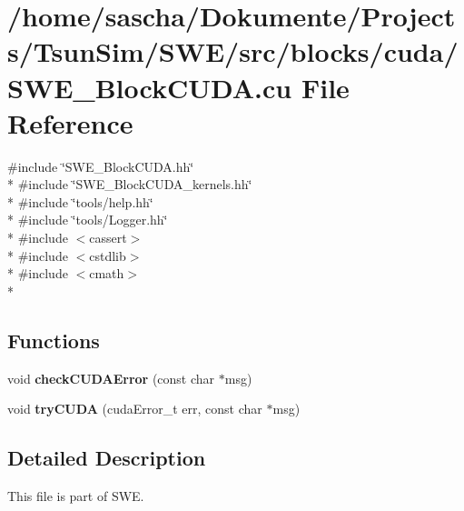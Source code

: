 \hypertarget{SWE__BlockCUDA_8cu}{\section{/home/sascha/\-Dokumente/\-Projects/\-Tsun\-Sim/\-S\-W\-E/src/blocks/cuda/\-S\-W\-E\-\_\-\-Block\-C\-U\-D\-A.cu File Reference}
\label{SWE__BlockCUDA_8cu}
}
{\ttfamily \#include \char`\"{}S\-W\-E\-\_\-\-Block\-C\-U\-D\-A.\-hh\char`\"{}}\\*
{\ttfamily \#include \char`\"{}S\-W\-E\-\_\-\-Block\-C\-U\-D\-A\-\_\-kernels.\-hh\char`\"{}}\\*
{\ttfamily \#include \char`\"{}tools/help.\-hh\char`\"{}}\\*
{\ttfamily \#include \char`\"{}tools/\-Logger.\-hh\char`\"{}}\\*
{\ttfamily \#include $<$cassert$>$}\\*
{\ttfamily \#include $<$cstdlib$>$}\\*
{\ttfamily \#include $<$cmath$>$}\\*
\subsection*{Functions}
\begin{DoxyCompactItemize}
\item 
\hypertarget{SWE__BlockCUDA_8cu_a3b360c7adecc62da0141b3c82e753c77}{void {\bfseries check\-C\-U\-D\-A\-Error} (const char $\ast$msg)}\label{SWE__BlockCUDA_8cu_a3b360c7adecc62da0141b3c82e753c77}

\item 
\hypertarget{SWE__BlockCUDA_8cu_a0cda924127c6de7246554ed6b80917e5}{void {\bfseries try\-C\-U\-D\-A} (cuda\-Error\-\_\-t err, const char $\ast$msg)}\label{SWE__BlockCUDA_8cu_a0cda924127c6de7246554ed6b80917e5}

\end{DoxyCompactItemize}


\subsection{Detailed Description}
This file is part of S\-W\-E.

